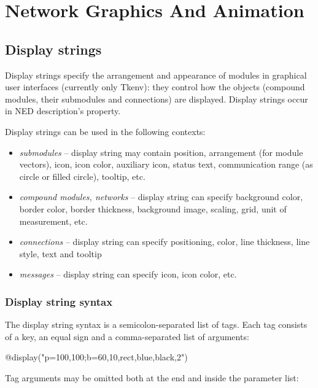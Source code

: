 \chapter{Network Graphics And Animation}
\label{cha:graphics}

\section{Display strings}
\label{sec:ch-graphics:display-strings}

Display strings specify the arrangement and
appearance of modules in graphical user interfaces (currently only
Tkenv): they control how the objects (compound modules, their
submodules and connections) are displayed. Display strings occur in
NED description's 
property.

Display strings can be used in the following contexts:
\begin{itemize}
  \item \textit{submodules} -- display string may contain position, arrangement
        (for module vectors), icon, icon color, auxiliary icon, status text,
        communication range (as circle or filled circle), tooltip, etc.
  \item \textit{compound modules, networks} -- display string can specify
        background color, border color, border thickness,
        background image, scaling, grid, unit of measurement, etc.
  \item \textit{connections} -- display string can specify positioning, color,
        line thickness, line style, text and tooltip
  \item \textit{messages} -- display string can specify icon, icon color, etc.
\end{itemize}


\subsection{Display string syntax}

The display string syntax is a semicolon-separated list of tags.
Each tag consists of a key, an equal sign and a comma-separated list of
arguments:

\begin{ned}
@display("p=100,100;b=60,10,rect,blue,black,2")
\end{ned}

Tag arguments may be omitted both at the end and inside the
parameter list:

